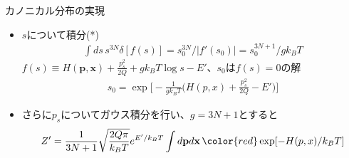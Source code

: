 
\begin{frame}[t,fragile]{カノニカル分布の実現}
  \begin{itemize}
  \item $s$について積分(*)
    \begin{align*}
      \int ds \, s^{3N} \delta[f(s)] = s_0^{3N} / | f'(s_0) | = s_0^{3N+1} / g k_B T
    \end{align*}
    $f(s) \equiv H(\mathbf{p},\mathbf{x}) + \frac{p_s^2}{2Q} + g k_B T \log s - E'$、$s_0$は$f(s)=0$の解
    \begin{align*}
      s_0 = \exp \Big[ -\frac{1}{gk_BT} \Big( H(p,x) + \frac{p_s^2}{2Q} - E' \Big) \Big]
    \end{align*}
  \item さらに$p_s$についてガウス積分を行い、$g=3N+1$とすると
    \begin{align*}
      Z' = \frac{1}{3N+1} \sqrt{\frac{2Q\pi}{k_BT}} e^{E'/k_BT} \int d\mathbf{p}d\mathbf{x} \, {\color{red}\exp [- H(p,x)/k_BT ]}
    \end{align*}
  \end{itemize}
\end{frame}

